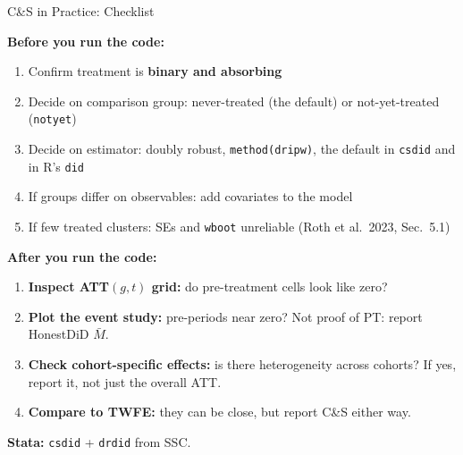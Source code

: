 \documentclass[main.tex]{subfiles}
\begin{document}
\begin{frame}{C\&S in Practice: Checklist}

  \textbf{Before you run the code:}
  \begin{enumerate}
    \item Confirm treatment is \textbf{binary and absorbing}
    \item Decide on comparison group: never-treated (the default) or
      not-yet-treated (\texttt{notyet})
    \item Decide on estimator: doubly robust, \texttt{method(dripw)},
      the default in \texttt{csdid} and in R's \texttt{did}
    \item If groups differ on observables: add covariates to the model
    \item If few treated clusters: SEs and \texttt{wboot} unreliable
      (Roth et al.\ 2023, Sec.~5.1)
  \end{enumerate}

  \bigskip
  \textbf{After you run the code:}
  \begin{enumerate}
    \item \textbf{Inspect ATT$(g,t)$ grid:} do pre-treatment cells
      look like zero?
    \item \textbf{Plot the event study:} pre-periods near zero? Not
      proof of PT: report HonestDiD $\bar M$.
    \item \textbf{Check cohort-specific effects:} is there heterogeneity
      across cohorts? If yes, report it, not just
      the overall ATT.
    \item \textbf{Compare to TWFE:} they can be close, but
      \alert{report C\&S either way}.
  \end{enumerate}

  \bigskip
  \textbf{Stata:} \texttt{csdid} + \texttt{drdid} from SSC.

\end{frame}
\end{document}
